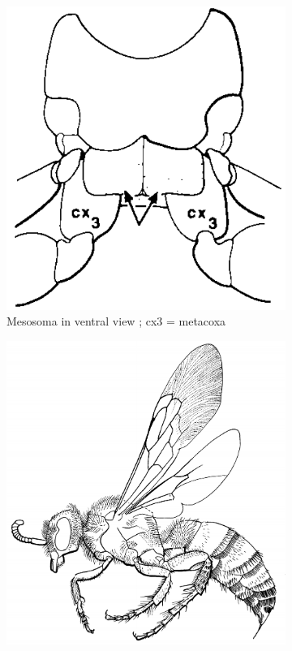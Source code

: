 \documentclass[letterpaper, 11pt]{article}
\begin{document}
\begin{figure}[ht!]
    \centering
    \begin{subfigure}[ht!]{0.28\textwidth}
        \includegraphics[width=\textwidth]{ScoliidMesosoma}
        \caption{Mesosoma in ventral view \citep[][pg. 162]{goulet1993hymenoptera}; cx3 = metacoxa}
        \label{fig:scoliid1}
    \end{subfigure}
    \qquad
    \begin{subfigure}[ht!]{0.38\textwidth}
        \includegraphics[width=\textwidth]{ScoliidHabitus}

\end{subfigure}
\end{figure}
\end{document}
